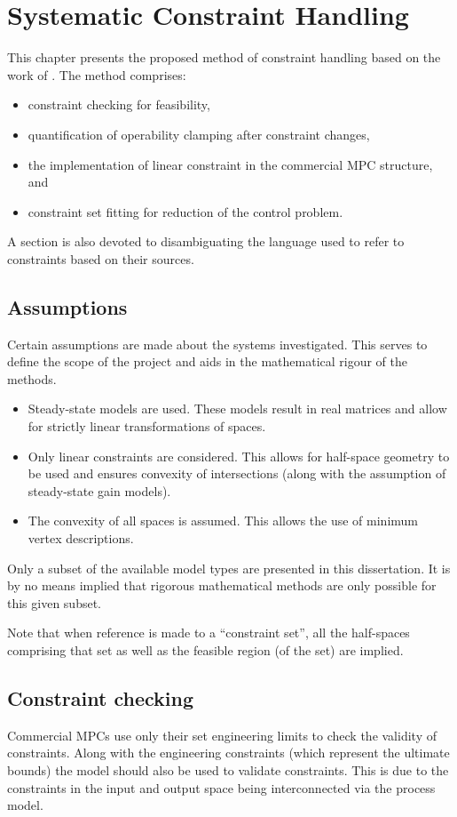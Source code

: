 \chapter{Systematic Constraint Handling}\label{chap:conhand}
\begin{overview}
  This chapter presents the proposed method of constraint handling based on the work of \citet{vinsonphd}.
  The method comprises:
  \begin{itemize}
    \item constraint checking for feasibility,
    \item quantification of operability clamping after constraint changes,
    \item the implementation of linear constraint in the commercial MPC structure, and
    \item constraint set fitting for reduction of the control problem.
  \end{itemize}
  A section is also devoted to disambiguating the language used to refer to constraints based on their sources.
\end{overview}

\section{Assumptions}
Certain assumptions are made about the systems investigated.
This serves to define the scope of the project and aids in the mathematical rigour of the methods.
\begin{itemize}
\item Steady-state models are used.
  These models result in real matrices and allow for strictly linear transformations of spaces.
\item Only linear constraints are considered.
  This allows for half-space geometry to be used and ensures convexity of intersections (along with the assumption of steady-state gain models).
\item The convexity of all spaces is assumed.
  This allows the use of minimum vertex descriptions.
\end{itemize}
Only a subset of the available model types are presented in this dissertation.
It is by no means implied that rigorous mathematical methods are only possible for this given subset.

Note that when reference is made to a ``constraint set'', all the half-spaces comprising that set as well as the feasible region (of the set) are implied.

\section{Constraint checking}
Commercial MPCs use only their set engineering limits to check the validity of constraints.
Along with the engineering constraints (which represent the ultimate bounds) the model should also be used to validate constraints. 
This is due to the constraints in the input and output space being interconnected via the process model.

